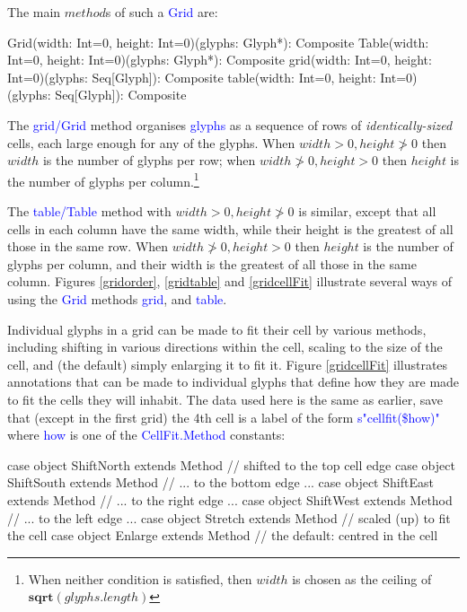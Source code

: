 \documentclass[12pt,a4paper]{article}
\def\Scala#1{\textcolor{blue}{\textsf{#1}}}
\begin{document}
The main $method$s of such a \Scala{Grid} are:
\begin{scala}
  Grid(width:  Int=0, height: Int=0)(glyphs: Glyph*): Composite
  Table(width: Int=0, height: Int=0)(glyphs: Glyph*): Composite
  grid(width:  Int=0, height: Int=0)(glyphs: Seq[Glyph]): Composite
  table(width: Int=0, height: Int=0)(glyphs: Seq[Glyph]): Composite
\end{scala}

The \Scala{grid/Grid} method organises \Scala{glyphs} as a sequence of
rows of \textit{identically-sized} cells,
each large enough for any of the glyphs.
When $width>0, height\not>0$ then $width$ is the
number of glyphs per row; when $width\not>0, height>0$ then
$height$ is the number of glyphs per column.\footnote{When
neither condition is satisfied, then $width$ is chosen
as the ceiling of $\mathbf{sqrt}(glyphs.length)$}

The \Scala{table/Table} method with $width>0, height\not>0$ is similar, except
that all cells in each column have the same width, while their height
is the greatest of all those in the same row. When
$width\not>0, height>0$ then
$height$ is the number of glyphs per column, and their width
is the greatest of all those in the same column.
Figures \ref{gridorder}, \ref{gridtable} and  \ref{gridcellFit} illustrate several ways of using
the \Scala{Grid} methods \Scala{grid}, and \Scala{table}.




Individual glyphs in a grid can be made to fit their cell by
various methods, including shifting in various directions within the cell, scaling to
the size of the cell, and (the default) simply enlarging it to fit it.
Figure \ref{gridcellFit} illustrates annotations that can be
made to individual glyphs that define how they are made to
fit the cells they will inhabit. The data used here is
the same as earlier, save that (except in the first grid) the 4th cell is a label of the form
\Scala{s"cellfit(\$how)"} where \Scala{how} is one of the \Scala{CellFit.Method}
constants:

\begin{scala}
case object ShiftNorth extends Method // shifted to the top cell edge
case object ShiftSouth extends Method // ... to the bottom edge ...
case object ShiftEast  extends Method // ... to the right edge ...
case object ShiftWest  extends Method // ... to the left edge ...
case object Stretch    extends Method // scaled (up) to fit the cell
case object Enlarge    extends Method // the default: centred in the cell
\end{scala}
\end{document}
